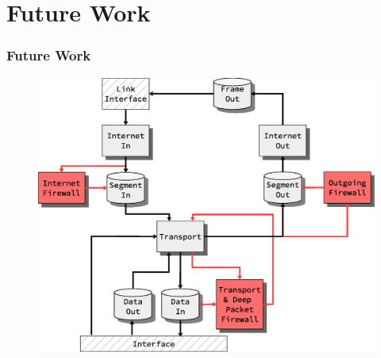 \section{Future Work}
\begin{frame}
  \frametitle{Future Work}

\begin{figure}
\centering
\includegraphics[scale=0.30]{../thesis/future_work/firewall_integration_design.eps}
\end{figure}

\end{frame}



